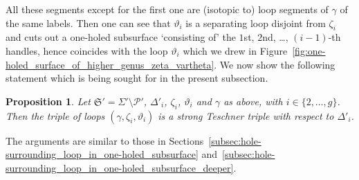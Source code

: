 \documentclass[pdftex]{sigma}
\numberwithin{equation}{section}
\newtheorem{Proposition}[Theorem]{Proposition}
\theoremstyle{definition}
\begin{document}
All these segments except for the first one are (isotopic to) loop segments of $\gamma$ of the same labels. Then one can see that $\vartheta_i$ is a separating loop disjoint from $\zeta_i$ and cuts out a one-holed subsurface `consisting of' the $1$st, $2$nd, \dots, $(i-1)$-th handles, hence coincides with the loop $\vartheta_i$ which we drew in Figure~\ref{fig:one-holed_surface_of_higher_genus_zeta_vartheta}.
We now show the following statement which is being sought for in the present subsection.
\begin{Proposition}
\label{prop:zeta_i_and_vartheta_i}
Let $\mathfrak{S}' = \Sigma'\setminus\mathcal{P}'$, $\Delta'_i$, $\zeta_i$, $\vartheta_i$ and $\gamma$ as above, with $i \in \{2,\dots,g\}$. Then the triple of loops $(\gamma,\zeta_i,\vartheta_i)$ is a strong Teschner triple with respect to $\Delta'_i$.
\end{Proposition}
The arguments are similar to those in Sections~\ref{subsec:hole-surrounding_loop_in_one-holed_subsurface} and~\ref{subsec:hole-surrounding_loop_in_one-holed_subsurface_deeper}.
\end{document}
